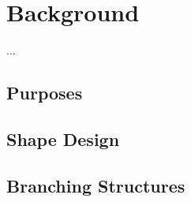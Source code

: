 \section{Background}

...

\subsection{Purposes}

\subsection{Shape Design}

\subsection{Branching Structures}
